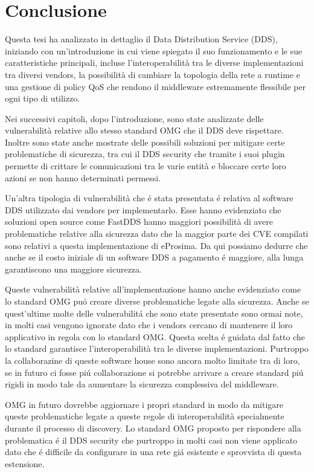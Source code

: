 \chapter{Conclusione}
Questa tesi ha analizzato in dettaglio il Data Distribution Service (DDS),
iniziando con un'introduzione in cui viene spiegato il suo funzionamento 
e le sue caratteristiche principali, incluse l'interoperabilità tra 
le diverse implementazioni tra diversi vendors, la possibilità di 
cambiare la topologia della rete a runtime e una gestione di policy 
QoS che rendono il middleware estremamente flessibile per ogni tipo 
di utilizzo. 

Nei successivi capitoli, dopo l'introduzione, sono state 
analizzate 
delle vulnerabilità relative allo stesso standard OMG che il 
DDS deve rispettare. Inoltre sono state anche mostrate delle
possibili soluzioni per mitigare certe problematiche di
sicurezza, tra cui il DDS security che tramite i suoi plugin 
permette di crittare le comunicazioni tra le varie entità e 
bloccare certe loro azioni se non hanno determinati permessi.

Un'altra tipologia di vulnerabilità che é stata presentata é 
relativa al software DDS utilizzato dai vendors per 
implementarlo. Esse hanno evidenziato che 
soluzioni open source come FastDDS hanno maggiori possibilità 
di avere problematiche relative alla sicurezza dato che
la maggior parte dei CVE compilati sono relativi a questa 
implementazione di eProsima. Da qui possiamo dedurre che 
anche se il costo iniziale di un software DDS a pagamento 
é maggiore, alla lunga garantiscono una maggiore sicurezza.

Queste vulnerabilità relative all'implementazione hanno anche
evidenziato 
come lo standard OMG puó creare diverse problematiche 
legate alla sicurezza. 
Anche se quest'ultime molte delle vulnerabilitá che sono state presentate 
sono ormai note, in molti casi vengono ignorate 
dato che i vendors cercano di mantenere il loro applicativo 
in regola con lo standard OMG. Questa scelta é guidata dal fatto che 
lo standard garantisce l'interoperabilità tra le diverse implementazioni. 
Purtroppo la collaborazine di queste software house sono ancora 
molto limitate tra di loro, se in futuro ci fosse piú collaborazione 
si potrebbe arrivare a creare standard piú rigidi in modo tale
da aumentare la sicurezza complessiva del middleware.

OMG in futuro dovrebbe aggiornare i propri standard in modo da 
mitigare queste problematiche legate a queste regole di interoperabilità
specialmente durante il 
processo di discovery. Lo standard OMG proposto per rispondere alla problematica
é il DDS security che purtroppo in molti casi 
non viene applicato dato che é difficile da 
configurare in una rete giá esistente e sprovvista di questa estensione.

